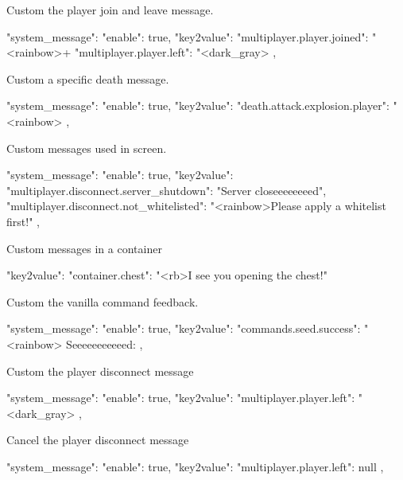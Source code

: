 \begin{example}{Custom the player join and leave message.}
    \begin{jsoncode}
        "system_message": {
            "enable": true,
            "key2value": {
                "multiplayer.player.joined": "<rainbow>+ %
                "multiplayer.player.left": "<dark_gray>%
            }
        },
    \end{jsoncode}

\end{example}

\begin{example}{Custom a specific death message.}
    \begin{jsoncode}
        "system_message": {
            "enable": true,
            "key2value": {
                "death.attack.explosion.player": "<rainbow>%
            }
        },
    \end{jsoncode}
\end{example}

\begin{example}{Custom messages used in screen.}
    \begin{jsoncode}
        "system_message": {
            "enable": true,
            "key2value": {
                "multiplayer.disconnect.server_shutdown": "Server closeeeeeeeed",
                "multiplayer.disconnect.not_whitelisted": "<rainbow>Please apply a whitelist first!"
            }
        },
    \end{jsoncode}
\end{example}

\begin{example}{Custom messages in a container}
    \begin{jsoncode}
        "key2value": {
            "container.chest": "<rb>I see you opening the chest!"
        }
    \end{jsoncode}
\end{example}

\begin{example}{Custom the vanilla command feedback.}
    \begin{jsoncode}
        "system_message": {
            "enable": true,
            "key2value": {
                "commands.seed.success": "<rainbow> Seeeeeeeeeeed: %
            }
        },
    \end{jsoncode}
\end{example}

\begin{example}{Custom the player disconnect message}
    \begin{jsoncode}
        "system_message": {
            "enable": true,
            "key2value": {
                "multiplayer.player.left": "<dark_gray>%
            }
        },
    \end{jsoncode}
\end{example}

\begin{example}{Cancel the player disconnect message}
    \begin{jsoncode}
        "system_message": {
            "enable": true,
            "key2value": {
                "multiplayer.player.left": null
            }
        },
    \end{jsoncode}
\end{example}

